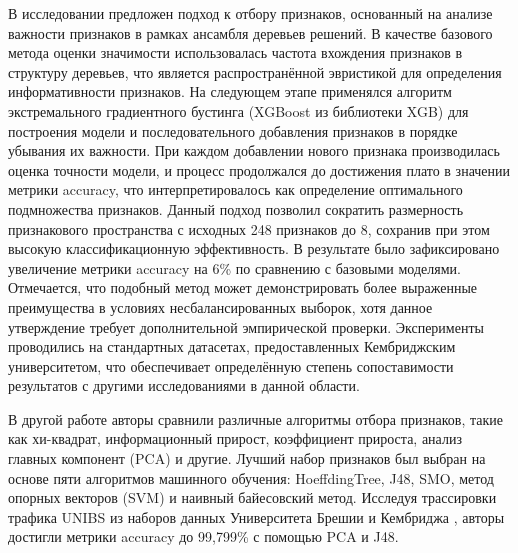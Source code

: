 В исследовании \cite{Manju2019} предложен подход к отбору признаков, основанный на анализе важности признаков в рамках ансамбля деревьев решений. В качестве базового метода оценки значимости использовалась частота вхождения признаков в структуру деревьев, что является распространённой эвристикой для определения информативности признаков. На следующем этапе применялся алгоритм экстремального градиентного бустинга (XGBoost из библиотеки XGB) для построения модели и последовательного добавления признаков в порядке убывания их важности. При каждом добавлении нового признака производилась оценка точности модели, и процесс продолжался до достижения плато в значении метрики accuracy, что интерпретировалось как определение оптимального подмножества признаков. Данный подход позволил сократить размерность признакового пространства с исходных 248 признаков до 8, сохранив при этом высокую классификационную эффективность. В результате было зафиксировано увеличение метрики accuracy на 6\% по сравнению с базовыми моделями. Отмечается, что подобный метод может демонстрировать более выраженные преимущества в условиях несбалансированных выборок, хотя данное утверждение требует дополнительной эмпирической проверки. Эксперименты проводились на стандартных датасетах, предоставленных Кембриджским университетом, что обеспечивает определённую степень сопоставимости результатов с другими исследованиями в данной области.


В другой работе \cite{Haitham2019} авторы сравнили различные алгоритмы отбора признаков, такие как хи-квадрат, информационный прирост, коэффициент прироста, анализ главных компонент (PCA) и другие. Лучший набор признаков был выбран на основе пяти алгоритмов машинного обучения: HoeffdingTree, J48, SMO, метод опорных векторов (SVM) и наивный байесовский метод. Исследуя трассировки трафика UNIBS из наборов данных Университета Брешии и Кембриджа \cite{unibs} , авторы достигли метрики accuracy до 99,799\% с помощью PCA и J48.


